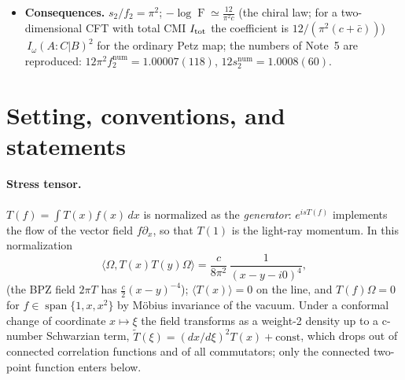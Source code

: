 \documentclass[11pt]{article}
\theoremstyle{accent}
\theoremstyle{definition}
\newcommand{\Fid}{\operatorname{F}}
\begin{document}
\begin{mainbox}
\begin{itemize}[leftmargin=1.4em,itemsep=2pt]
\item \textbf{Consequences.}  \(s_2/f_2=\pi^2\); \(-\log\Fid\simeq\frac{12}{\pi^2c}\) (the chiral law; for a two-dimensional CFT with total CMI \(I_{\rm tot}\) the coefficient is \(12/(\pi^2(c+\bar c))\)) \(\,I_\omega(A{:}C|B)^2\) for the ordinary Petz map; the numbers of Note~5 are reproduced: \(12\pi^2f_2^{\mathrm{num}}=1.00007(118)\), \(12s_2^{\mathrm{num}}=1.0008(60)\).
\end{itemize}
\end{mainbox}

\tableofcontents
\clearpage
\section{Setting, conventions, and statements}\label{sec:setting}

\paragraph{Stress tensor.}
\(T(f)=\int T(x)f(x)\,dx\) is normalized as the \emph{generator}: \(e^{isT(f)}\) implements the flow of the vector field \(f\partial_x\), so that \(T(1)\) is the light-ray momentum.  In this normalization
\begin{equation}\label{eq:TT}
 \langle\Omega,T(x)T(y)\Omega\rangle=\frac{c}{8\pi^2}\,\frac{1}{(x-y-i0)^4},
\end{equation}
(the BPZ field \(2\pi T\) has \(\frac c2(x-y)^{-4}\)); \(\langle T(x)\rangle=0\) on the line, and \(T(f)\Omega=0\) for \(f\in\operatorname{span}\{1,x,x^2\}\) by M\"obius invariance of the vacuum.  Under a conformal change of coordinate \(x\mapsto\xi\) the field transforms as a weight-2 density up to a c-number Schwarzian term, \(\widetilde T(\xi)=(dx/d\xi)^2T(x)+\text{const}\), which drops out of connected correlation functions and of all commutators; only the connected two-point function enters below.
\end{document}
